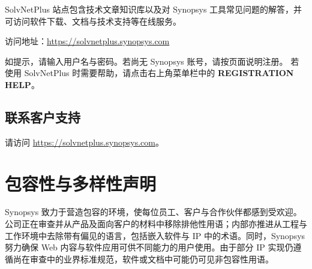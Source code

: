 SolvNetPlus 站点包含技术文章知识库以及对 Synopsys 工具常见问题的解答，并可访问软件下载、文档与技术支持等在线服务。

访问地址：\url{https://solvnetplus.synopsys.com}

如提示，请输入用户名与密码。若尚无 Synopsys 账号，请按页面说明注册。
若使用 SolvNetPlus 时需要帮助，请点击右上角菜单栏中的 \textbf{REGISTRATION HELP}。

\subsection*{联系客户支持}

请访问 \url{https://solvnetplus.synopsys.com}。

\section*{包容性与多样性声明}

Synopsys 致力于营造包容的环境，使每位员工、客户与合作伙伴都感到受欢迎。公司正在审查并从产品及面向客户的材料中移除排他性用语；内部亦推进从工程与工作环境中去除带有偏见的语言，包括嵌入软件与 IP 中的术语。同时，Synopsys 努力确保 Web 内容与软件应用可供不同能力的用户使用。由于部分 IP 实现仍遵循尚在审查中的业界标准规范，软件或文档中可能仍可见非包容性用语。
